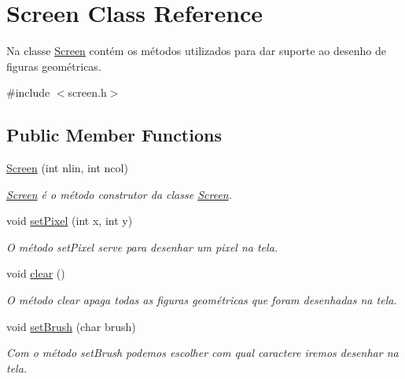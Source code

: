 \hypertarget{classScreen}{}\section{Screen Class Reference}
\label{classScreen}


Na classe \hyperlink{classScreen}{Screen} contém os métodos utilizados para dar suporte ao desenho de figuras geométricas.  




{\ttfamily \#include $<$screen.\+h$>$}

\subsection*{Public Member Functions}
\begin{DoxyCompactItemize}
\item 
\hyperlink{classScreen_a246eac542489ef06335800fae60827ee}{Screen} (int nlin, int ncol)
\begin{DoxyCompactList}\small\item\em \hyperlink{classScreen}{Screen} é o método construtor da classe \hyperlink{classScreen}{Screen}. \end{DoxyCompactList}\item 
void \hyperlink{classScreen_ae6bea81c57a22d226507c3c26fa95ee0}{set\+Pixel} (int x, int y)
\begin{DoxyCompactList}\small\item\em O método set\+Pixel serve para desenhar um pixel na tela. \end{DoxyCompactList}\item 
\mbox{\label{classScreen_a35e74266b2a04e37b354ceff7a5f1031}} 
void \hyperlink{classScreen_a35e74266b2a04e37b354ceff7a5f1031}{clear} ()
\begin{DoxyCompactList}\small\item\em O método clear apaga todas as figuras geométricas que foram desenhadas na tela. \end{DoxyCompactList}\item 
void \hyperlink{classScreen_a14a00e158f99df199772172554a20576}{set\+Brush} (char brush)
\begin{DoxyCompactList}\small\item\em Com o método set\+Brush podemos escolher com qual caractere iremos desenhar na tela. \end{DoxyCompactList}\end{DoxyCompactItemize}
